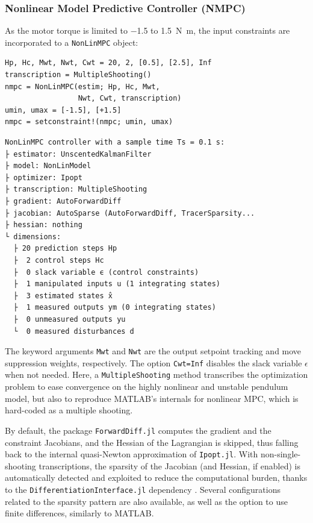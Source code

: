 \subsubsection{Nonlinear Model Predictive Controller (NMPC)}

As the motor torque is limited to \num{-1.5} to \SI{1.5}{\newton\meter}, the input constraints are incorporated to a \texttt{NonLinMPC} object:
\begin{verbatim}
Hp, Hc, Mwt, Nwt, Cwt = 20, 2, [0.5], [2.5], Inf
transcription = MultipleShooting()
nmpc = NonLinMPC(estim; Hp, Hc, Mwt, 
                 Nwt, Cwt, transcription)
umin, umax = [-1.5], [+1.5]
nmpc = setconstraint!(nmpc; umin, umax)
\end{verbatim}
\spacerepl\vspace{0.4em}
\begin{verbatim}
NonLinMPC controller with a sample time Ts = 0.1 s:
├ estimator: UnscentedKalmanFilter
├ model: NonLinModel
├ optimizer: Ipopt 
├ transcription: MultipleShooting
├ gradient: AutoForwardDiff
├ jacobian: AutoSparse (AutoForwardDiff, TracerSparsity...
├ hessian: nothing
└ dimensions:
  ├ 20 prediction steps Hp
  ├  2 control steps Hc
  ├  0 slack variable ϵ (control constraints)
  ├  1 manipulated inputs u (1 integrating states)
  ├  3 estimated states x̂
  ├  1 measured outputs ym (0 integrating states)
  ├  0 unmeasured outputs yu
  └  0 measured disturbances d
\end{verbatim}
The keyword arguments \texttt{Mwt} and \texttt{Nwt} are the output setpoint tracking and move suppression weights, respectively. The option \texttt{Cwt=Inf} disables the slack variable $\epsilon$ when not needed. Here, a \texttt{MultipleShooting} method transcribes the optimization problem to ease convergence on the highly nonlinear and unstable pendulum model, but also to reproduce MATLAB's internals for nonlinear MPC, which is hard-coded as a multiple shooting. 

By default, the package \texttt{ForwardDiff.jl} computes the gradient and the constraint Jacobians, and the Hessian of the Lagrangian is skipped, thus falling back to the internal quasi-Newton approximation of \texttt{Ipopt.jl}. With non-single-shooting transcriptions, the sparsity of the Jacobian (and Hessian, if enabled) is automatically detected and exploited to reduce the computational burden, thanks to the \texttt{DifferentiationInterface.jl} dependency \citep{differentiationinterface}. Several configurations related to the sparsity pattern are also available, as well as the option to use finite differences, similarly to MATLAB.  

